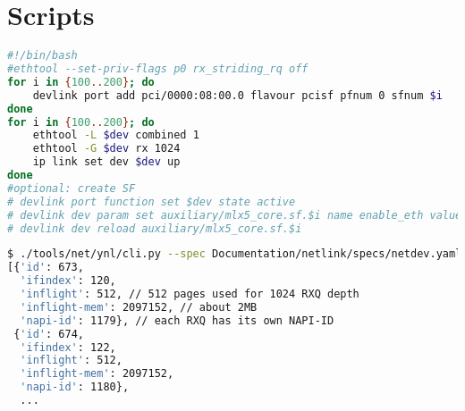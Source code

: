 \section{Scripts} \label{sec:bash_script}

\begin{lstlisting}[language=sh, caption={SF-representor setup on BlueField}, label={lst:sf}]
#!/bin/bash
#ethtool --set-priv-flags p0 rx_striding_rq off
for i in {100..200}; do
    devlink port add pci/0000:08:00.0 flavour pcisf pfnum 0 sfnum $i
done
for i in {100..200}; do
    ethtool -L $dev combined 1
    ethtool -G $dev rx 1024
    ip link set dev $dev up
done	
#optional: create SF
# devlink port function set $dev state active
# devlink dev param set auxiliary/mlx5_core.sf.$i name enable_eth value 1 cmode driverinit
# devlink dev reload auxiliary/mlx5_core.sf.$i
\end{lstlisting}

\begin{lstlisting}[language=sh, caption={Collect page\_pool usage on BlueField}, label={lst:bash_script}]
$ ./tools/net/ynl/cli.py --spec Documentation/netlink/specs/netdev.yaml  --dump page-pool-get
[{'id': 673,
  'ifindex': 120,
  'inflight': 512, // 512 pages used for 1024 RXQ depth
  'inflight-mem': 2097152, // about 2MB
  'napi-id': 1179}, // each RXQ has its own NAPI-ID
 {'id': 674,
  'ifindex': 122,
  'inflight': 512,
  'inflight-mem': 2097152,
  'napi-id': 1180},
  ...
\end{lstlisting}

